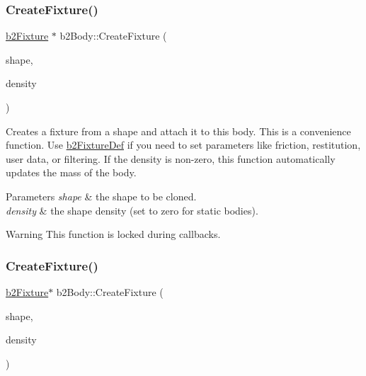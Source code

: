 \subsubsection{\texorpdfstring{Create\+Fixture()}{CreateFixture()}\hspace{0.1cm}{\footnotesize\ttfamily [3/4]}}
{\footnotesize\ttfamily \hyperlink{classb2Fixture}{b2\+Fixture} $\ast$ b2\+Body\+::\+Create\+Fixture (\begin{DoxyParamCaption}\item[{const \hyperlink{classb2Shape}{b2\+Shape} $\ast$}]{shape,  }\item[{float32}]{density }\end{DoxyParamCaption})}

Creates a fixture from a shape and attach it to this body. This is a convenience function. Use \hyperlink{structb2FixtureDef}{b2\+Fixture\+Def} if you need to set parameters like friction, restitution, user data, or filtering. If the density is non-\/zero, this function automatically updates the mass of the body. 
\begin{DoxyParams}{Parameters}
{\em shape} & the shape to be cloned. \\
\hline
{\em density} & the shape density (set to zero for static bodies). \\
\hline
\end{DoxyParams}
\begin{DoxyWarning}{Warning}
This function is locked during callbacks. 
\end{DoxyWarning}
\mbox{\label{classb2Body_a9bdbbc58d1cc51aec51a978174a2ba48}} 
\subsubsection{\texorpdfstring{Create\+Fixture()}{CreateFixture()}\hspace{0.1cm}{\footnotesize\ttfamily [4/4]}}
{\footnotesize\ttfamily \hyperlink{classb2Fixture}{b2\+Fixture}$\ast$ b2\+Body\+::\+Create\+Fixture (\begin{DoxyParamCaption}\item[{const \hyperlink{classb2Shape}{b2\+Shape} $\ast$}]{shape,  }\item[{float32}]{density }\end{DoxyParamCaption})}

